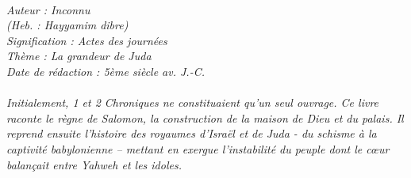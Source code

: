 \BFont
\noindent\hrulefill
{\footnotesize
\textit{
\bigskip
{\centering{}
\\Auteur : Inconnu
\\(Heb. : Hayyamim dibre)
\\Signification : Actes des journées
\\Thème : La grandeur de Juda
\\Date de rédaction : 5ème siècle av. J.-C.\\}
}
\textit{
\\Initialement, 1 et 2 Chroniques ne constituaient qu’un seul ouvrage. Ce livre raconte le règne de
Salomon, la construction de la maison de Dieu et du palais. Il reprend ensuite l’histoire des royaumes d’Israël et de
Juda - du schisme à la captivité babylonienne – mettant en exergue l’instabilité du peuple dont le cœur balançait entre
Yahweh et les idoles.\bigskip
}
}
\par\nobreak\noindent\hrulefill
